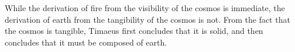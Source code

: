 While the derivation of fire from the visibility of the cosmos is immediate, the derivation of earth from the tangibility of the cosmos is not. From the fact that the cosmos is tangible, Timaeus first concludes that it is solid, and then concludes that it must be composed of earth.





